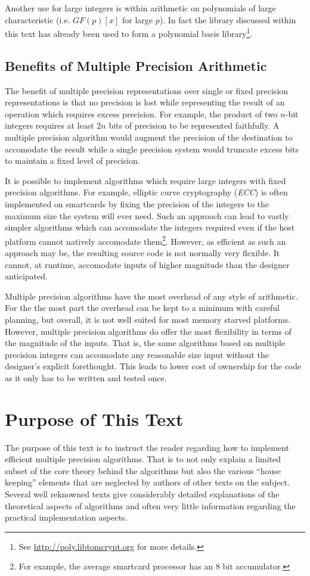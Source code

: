 \documentclass[b5paper]{book}
\begin{document}
Another use for large integers is within arithmetic on polynomials of large characteristic (i.e. $GF(p)[x]$ for large $p$).
In fact the library discussed within this text has already been used to form a polynomial basis library\footnote{See \url{http://poly.libtomcrypt.org} for more details.}.

\subsection{Benefits of Multiple Precision Arithmetic}
The benefit of multiple precision representations over single or fixed precision representations is that 
no precision is lost while representing the result of an operation which requires excess precision.  For example, 
the product of two $n$-bit integers requires at least $2n$ bits of precision to be represented faithfully.  A multiple 
precision algorithm would augment the precision of the destination to accomodate the result while a single precision system 
would truncate excess bits to maintain a fixed level of precision.

It is possible to implement algorithms which require large integers with fixed precision algorithms.  For example, elliptic
curve cryptography (\textit{ECC}) is often implemented on smartcards by fixing the precision of the integers to the maximum 
size the system will ever need.  Such an approach can lead to vastly simpler algorithms which can accomodate the 
integers required even if the host platform cannot natively accomodate them\footnote{For example, the average smartcard 
processor has an 8 bit accumulator.}.  However, as efficient as such an approach may be, the resulting source code is not
normally very flexible.  It cannot, at runtime, accomodate inputs of higher magnitude than the designer anticipated.

Multiple precision algorithms have the most overhead of any style of arithmetic.  For the the most part the 
overhead can be kept to a minimum with careful planning, but overall, it is not well suited for most memory starved
platforms.  However, multiple precision algorithms do offer the most flexibility in terms of the magnitude of the 
inputs.  That is, the same algorithms based on multiple precision integers can accomodate any reasonable size input 
without the designer's explicit forethought.  This leads to lower cost of ownership for the code as it only has to 
be written and tested once.

\section{Purpose of This Text}
The purpose of this text is to instruct the reader regarding how to implement efficient multiple precision algorithms.  
That is to not only explain a limited subset of the core theory behind the algorithms but also the various ``house keeping'' 
elements that are neglected by authors of other texts on the subject.  Several well reknowned texts \cite{TAOCPV2,HAC} 
give considerably detailed explanations of the theoretical aspects of algorithms and often very little information 
regarding the practical implementation aspects.  
\end{document}
